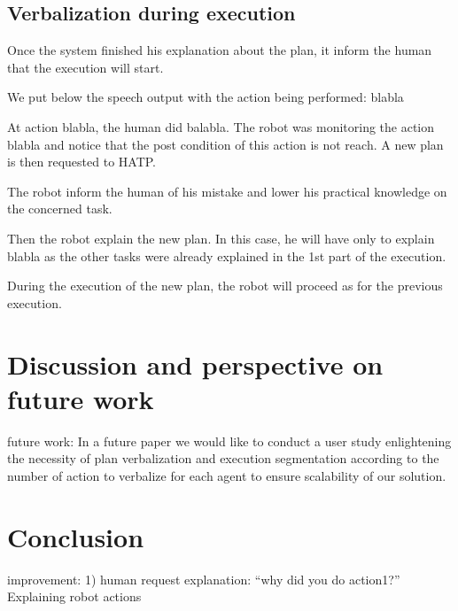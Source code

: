 \documentclass{llncs}
\begin{document}
\subsection{Verbalization during execution}
Once the system finished his explanation about the plan, it inform the human that the execution will start.

We put below the speech output with the action being performed:
blabla

At action blabla, the human did balabla. The robot was monitoring the action blabla and notice that the post condition of this action is not reach. A new plan is then requested to HATP.

The robot inform the human of his mistake and lower his practical knowledge on the concerned task.

Then the robot explain the new plan. In this case, he will have only to explain blabla as the other tasks were already explained in the 1st part of the execution.

During the execution of the new plan, the robot will proceed as for the previous execution.






\section{Discussion and perspective on future work}


future work:
In a future paper we would like to conduct a user study enlightening the necessity of  plan verbalization and execution segmentation according to the number of action to verbalize for each agent to ensure scalability of our solution.

\section{Conclusion}
improvement:
1) human request explanation: ``why did you do action1?''
Explaining robot actions \cite{Lomas2012}



%


\end{document}
